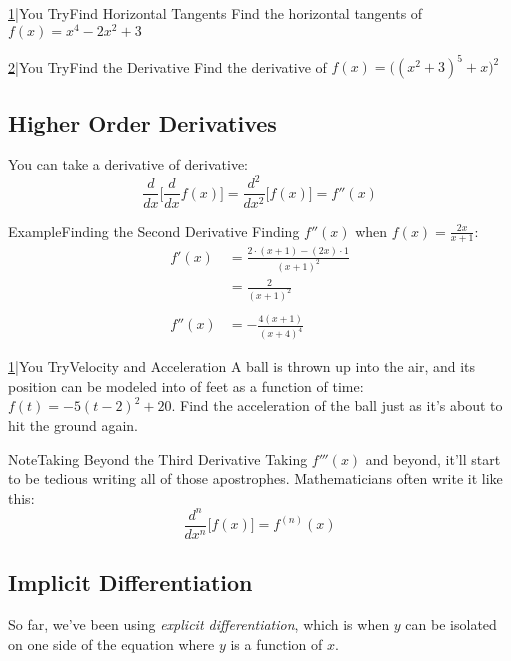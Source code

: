 \documentclass{MathNotes}
\newenvironment{example}[1]{\begin{BlueBox}{Example}{#1}}{\end{BlueBox}}
\newenvironment{note}[1]{\begin{YellowBox}{Note}{#1}}{\end{YellowBox}}
\newenvironment{practice}[2]{\begin{PurpleBox}{\texorpdfstring{#1}\Big|You Try}{#2}}{\end{PurpleBox}}
\begin{document}
\begin{multicols}{2}
	\begin{practice}{\hyperref[ans:2.2-1]{1}}{Find Horizontal Tangents}
		\label{prac:2.2-1}
		Find the horizontal tangents of $f(x)=x^4-2x^2+3$
	\end{practice}
	\begin{practice}{\hyperref[ans:2.2-2]{2}}{Find the Derivative}
		\label{prac:2.2-2}
		Find the derivative of \newline$\displaystyle f(x)=\big((x^2+3)^5+x\big)^2$
	\end{practice}
\end{multicols}

\subsection{Higher Order Derivatives}
You can take a derivative of derivative:
\begin{displaymath}
	\frac{d}{dx}\big[\frac{d}{dx}f(x)\big]=\frac{d^2}{dx^2}\big[f(x)\big]
	=f''(x)
\end{displaymath}
\begin{example}{Finding the Second Derivative}
	Finding $f''(x)$ when $f(x)=\frac{2x}{x+1}$:
	\begin{align*}
		f'(x)  & =\frac{2\cdot(x+1)-(2x)\cdot 1}{(x+1)^2} \\
		       & =\frac{2}{(x+1)^2}                       \\
		\\
		f''(x) & =-\frac{4(x+1)}{(x+4)^4}
	\end{align*}
\end{example}
\begin{practice}{\hyperref[ans:2.3.1-1]{1}}{Velocity and Acceleration}
	\label{prac:2.3.1-1}
	A ball is thrown up into the air, and its position can be modeled into
	of feet as a function of time: $f(t)=-5(t-2)^2+20$. Find the acceleration
	of the ball just as it's about to hit the ground again.
\end{practice}
\begin{note}{Taking Beyond the Third Derivative}
	Taking $f'''(x)$ and beyond, it'll start to be tedious writing all of those
	apostrophes. Mathematicians often write it like this:
	$$\frac{d^n}{dx^n}\big[f(x)\big]=f^{(n)}(x)$$
\end{note}

\subsection{Implicit Differentiation}
So far, we've been using \textit{explicit differentiation}, which is when $y$
can be isolated on one side of the equation where $y$ is a function of $x$.
\end{document}

